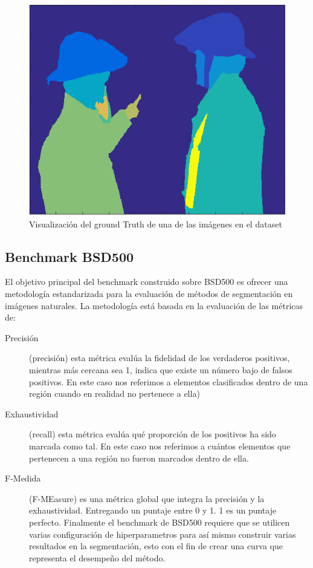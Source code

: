 \documentclass[10pt,twocolumn,letterpaper]{article}
\begin{document}
\begin{figure}

\includegraphics[width=0.85\linewidth]
                {img/Imagesc.png}
\caption{Visualización del ground Truth de una de las imágenes en el dataset}
\label{fig:short2}
\end{figure}

\subsection{Benchmark  BSD500}
El objetivo principal del benchmark construido sobre BSD500 es ofrecer una metodología estandarizada para la evaluación de métodos de segmentación en imágenes naturales. La metodología está basada en la evaluación de las métricas de:
\begin{description}


\item[Precisión] (precisión) esta métrica evalúa la fidelidad de los verdaderos positivos, mientras más cercana sea 1, indica que existe un número bajo de falsos positivos. En este caso nos referimos a elementos clasificados dentro de una región cuando en realidad no pertenece a ella)

\item[Exhaustividad] (recall) esta métrica evalúa qué proporción  de los positivos ha sido marcada como tal. En este caso nos referimos a cuántos elementos que pertenecen a una región no fueron marcados dentro de ella.

\item[F-Medida] (F-MEasure)  es una métrica global que integra la precisión y la exhaustividad. Entregando un puntaje entre 0 y 1. 1 es un puntaje perfecto.
Finalmente el benchmark de BSD500 requiere que se utilicen varias configuración de hiperparametros para así mismo construir varias resultados en la segmentación,  esto con el fin de crear una curva que representa el desempeño del método.
\end{description}
\end{document}
